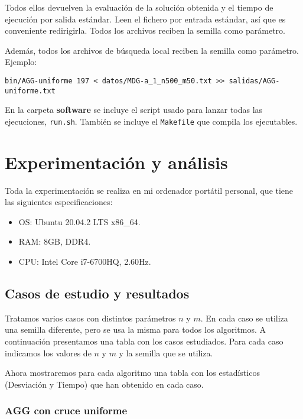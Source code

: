 \documentclass{article}
\begin{document}
Todos ellos devuelven la evaluación de la solución obtenida y el tiempo de ejecución por salida estándar.
Leen el fichero por entrada estándar, así que es conveniente redirigirla.
Todos los archivos reciben la semilla como parámetro.

Además, todos los archivos de búsqueda local reciben la semilla como parámetro. Ejemplo:
\begin{verbatim}
bin/AGG-uniforme 197 < datos/MDG-a_1_n500_m50.txt >> salidas/AGG-uniforme.txt
\end{verbatim}

En la carpeta \textbf{software} se incluye el script usado para lanzar todas las ejecuciones, \texttt{run.sh}. También se incluye
el \texttt{Makefile} que compila los ejecutables.

\pagebreak

\section{Experimentación y análisis}

Toda la experimentación se realiza en mi ordenador portátil personal, que tiene las siguientes especificaciones:
\begin{itemize}
	\item OS: Ubuntu 20.04.2 LTS x86\_64.
	\item RAM: 8GB, DDR4.
	\item CPU: Intel Core i7-6700HQ, 2.60Hz.
\end{itemize}

\subsection{Casos de estudio y resultados}

Tratamos varios casos con distintos parámetros $n$ y $m$. En cada caso se utiliza una semilla diferente, pero se usa la misma para todos los algoritmos.
A continuación presentamos una tabla con los casos estudiados. Para cada caso indicamos los valores de $n$ y $m$ y la semilla
que se utiliza.

Ahora mostraremos para cada algoritmo una tabla con los estadísticos (Desviación y Tiempo) que han obtenido en cada
caso.

\pagebreak

\subsubsection*{AGG con cruce uniforme}
\end{document}
